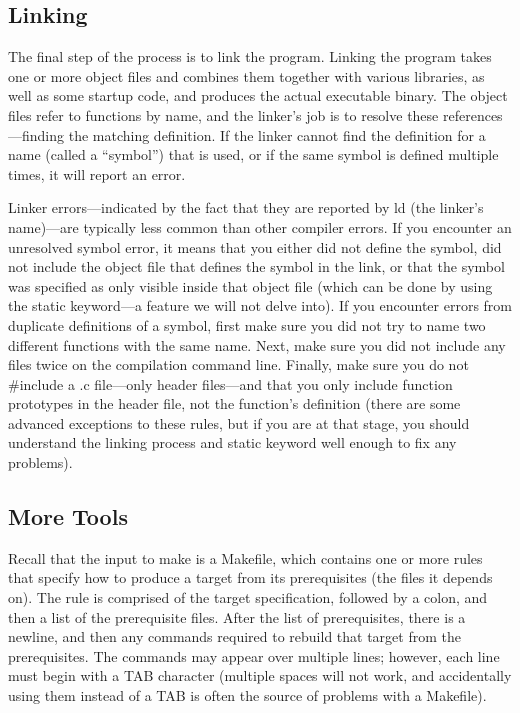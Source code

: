 \documentclass[11pt, a4paper]{article}
\begin{document}
\subsection{Linking}%
\label{sub:linking}



The final step of the process is to link the program. Linking the program takes one or more object files and combines them together with various libraries, as well as some startup code, and produces the actual executable binary. The object files refer to functions by name, and the linker’s job is to resolve these references—finding the matching definition. If the linker cannot find the definition for a name (called a “symbol”) that is used, or if the same symbol is defined multiple times, it will report an error.

Linker errors—indicated by the fact that they are reported by ld (the linker’s name)—are typically less common than other compiler errors. If you encounter an unresolved symbol error, it means that you either did not define the symbol, did not include the object file that defines the symbol in the link, or that the symbol was specified as only visible inside that object file (which can be done by using the static keyword—a feature we will not delve into). If you encounter errors from duplicate definitions of a symbol, first make sure you did not try to name two different functions with the same name. Next, make sure you did not include any files twice on the compilation command line. Finally, make sure you do not \#include a .c file—only header files—and that you only include function prototypes in the header file, not the function’s definition (there are some advanced exceptions to these rules, but if you are at that stage, you should understand the linking process and static keyword well enough to fix any problems).




\subsection{More Tools}%
\label{sub:more_tools}

Recall that the input to make is a Makefile, which contains one or more rules that specify how to produce a target from its prerequisites (the files it depends on). The rule is comprised of the target specification, followed by a colon, and then a list of the prerequisite files. After the list of prerequisites, there is a newline, and then any commands required to rebuild that target from the prerequisites. The commands may appear over multiple lines; however, each line must begin with a TAB character (multiple spaces will not work, and accidentally using them instead of a TAB is often the source of problems with a Makefile).
\end{document}

